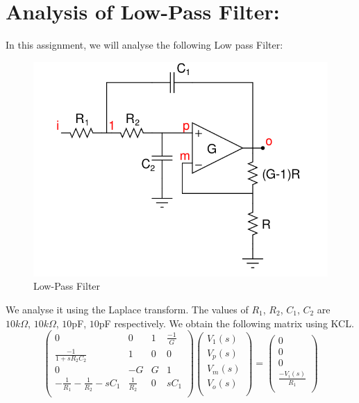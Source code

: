 \documentclass[11pt, a4paper]{article}
\begin{document}
\section{Analysis of Low-Pass Filter:}
    In this assignment, we will analyse the following Low pass Filter:
    \begin{figure}[H]
        \centering
        \includegraphics[scale=0.35]{lpf_ckt.png}
        \caption{Low-Pass Filter}
        \label{fig:ckt1}
    \end{figure}
    We analyse it using the Laplace transform. The values of $R_1$, $R_2$, $C_1$, $C_2$ are $10k\Omega$, $10k\Omega$, $10$pF, $10$pF respectively.\newline
    We obtain the following matrix using KCL. 
    \begin{equation}
        \begin{pmatrix}
            0&0&1&\frac{-1}{G}\\
            \frac{-1}{1+sR_2C_2}&1&0&0\\
            0&-G&G&1\\
            -\frac{1}{R_1}-\frac{1}{R_2}-sC_1&\frac{1}{R_2}&0&sC_1\\
        \end{pmatrix}
        \begin{pmatrix}
            V_1(s)\\
            V_p(s)\\
            V_m(s)\\
            V_o(s)\\
        \end{pmatrix}
        =
        \begin{pmatrix}
            0\\
            0\\
            0\\
            \frac{-V_i(s)}{R_1}\\
        \end{pmatrix}
    \end{equation}
\end{document}
